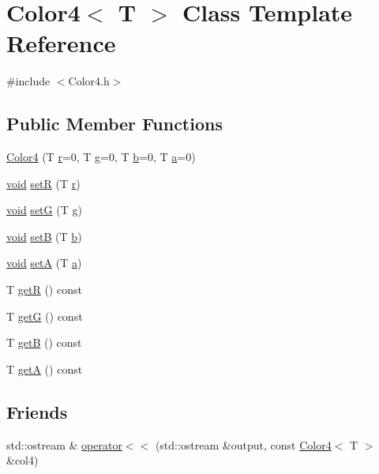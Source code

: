 \hypertarget{class_color4}{\section{Color4$<$ T $>$ Class Template Reference}
\label{class_color4}
}


{\ttfamily \#include $<$Color4.\-h$>$}

\subsection*{Public Member Functions}
\begin{DoxyCompactItemize}
\item 
\hyperlink{class_color4_a0ea6fcc52c1b438dacca912dc0eede9a}{Color4} (T \hyperlink{gl3_8h_abe08814c2f72843fde4d8df41440d5a0}{r}=0, T \hyperlink{gl3_8h_a9cd653b1648845554169fbc3a3f6d37a}{g}=0, T \hyperlink{gl3_8h_a6eba317e3cf44d6d26c04a5a8f197dcb}{b}=0, T \hyperlink{gl3_8h_ac8729153468b5dcf13f971b21d84d4e5}{a}=0)
\item 
\hyperlink{glutf90_8h_ac778d6f63f1aaf8ebda0ce6ac821b56e}{void} \hyperlink{class_color4_aa4292dd29466cfadd868c80cfdb2d65f}{set\-R} (T \hyperlink{gl3_8h_abe08814c2f72843fde4d8df41440d5a0}{r})
\item 
\hyperlink{glutf90_8h_ac778d6f63f1aaf8ebda0ce6ac821b56e}{void} \hyperlink{class_color4_a995d05e738e36e64bacf15d6b43e4d46}{set\-G} (T \hyperlink{gl3_8h_a9cd653b1648845554169fbc3a3f6d37a}{g})
\item 
\hyperlink{glutf90_8h_ac778d6f63f1aaf8ebda0ce6ac821b56e}{void} \hyperlink{class_color4_a4594591b82f7a4e07c1d9ea8e88475dd}{set\-B} (T \hyperlink{gl3_8h_a6eba317e3cf44d6d26c04a5a8f197dcb}{b})
\item 
\hyperlink{glutf90_8h_ac778d6f63f1aaf8ebda0ce6ac821b56e}{void} \hyperlink{class_color4_a40eae4878e30c045175e2844382ebf6b}{set\-A} (T \hyperlink{gl3_8h_ac8729153468b5dcf13f971b21d84d4e5}{a})
\item 
T \hyperlink{class_color4_a78c6e0e5837397123d49b9b69e96b82c}{get\-R} () const 
\item 
T \hyperlink{class_color4_aac32952538c6a6818605eb32f787d4e9}{get\-G} () const 
\item 
T \hyperlink{class_color4_af3ef1ead524a09949357f870481f4127}{get\-B} () const 
\item 
T \hyperlink{class_color4_a3a2f3de17bddc61d2e395db3bd71d306}{get\-A} () const 
\end{DoxyCompactItemize}
\subsection*{Friends}
\begin{DoxyCompactItemize}
\item 
std\-::ostream \& \hyperlink{class_color4_a2aeb6890e4cd6f2a36bd730be95ef111}{operator$<$$<$} (std\-::ostream \&output, const \hyperlink{class_color4}{Color4}$<$ T $>$ \&col4)
\end{DoxyCompactItemize}


